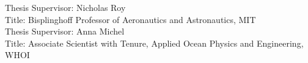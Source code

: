 \begin{singlespace}
        \noindent Thesis Supervisor: Nicholas Roy \\
        \noindent Title: Bisplinghoff Professor of Aeronautics and Astronautics, MIT \\

        \noindent Thesis Supervisor: Anna Michel \\
        \noindent Title: Associate Scientist with Tenure, Applied Ocean Physics and Engineering, WHOI

    \end{singlespace}
    
    \newpage
    \null
    \thispagestyle{empty}
    \newpage

